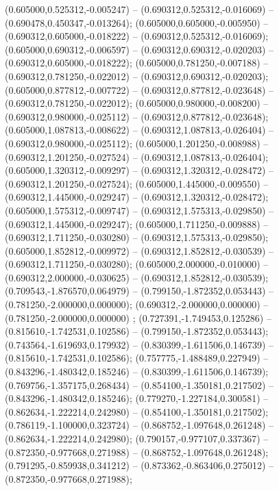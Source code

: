  (0.605000,0.525312,-0.005247) -- (0.690312,0.525312,-0.016069) -- (0.690478,0.450347,-0.013264);
 (0.605000,0.605000,-0.005950) -- (0.690312,0.605000,-0.018222) -- (0.690312,0.525312,-0.016069);
 (0.605000,0.690312,-0.006597) -- (0.690312,0.690312,-0.020203) -- (0.690312,0.605000,-0.018222);
 (0.605000,0.781250,-0.007188) -- (0.690312,0.781250,-0.022012) -- (0.690312,0.690312,-0.020203);
 (0.605000,0.877812,-0.007722) -- (0.690312,0.877812,-0.023648) -- (0.690312,0.781250,-0.022012);
 (0.605000,0.980000,-0.008200) -- (0.690312,0.980000,-0.025112) -- (0.690312,0.877812,-0.023648);
 (0.605000,1.087813,-0.008622) -- (0.690312,1.087813,-0.026404) -- (0.690312,0.980000,-0.025112);
 (0.605000,1.201250,-0.008988) -- (0.690312,1.201250,-0.027524) -- (0.690312,1.087813,-0.026404);
 (0.605000,1.320312,-0.009297) -- (0.690312,1.320312,-0.028472) -- (0.690312,1.201250,-0.027524);
 (0.605000,1.445000,-0.009550) -- (0.690312,1.445000,-0.029247) -- (0.690312,1.320312,-0.028472);
 (0.605000,1.575312,-0.009747) -- (0.690312,1.575313,-0.029850) -- (0.690312,1.445000,-0.029247);
 (0.605000,1.711250,-0.009888) -- (0.690312,1.711250,-0.030280) -- (0.690312,1.575313,-0.029850);
 (0.605000,1.852812,-0.009972) -- (0.690312,1.852812,-0.030539) -- (0.690312,1.711250,-0.030280);
 (0.605000,2.000000,-0.010000) -- (0.690312,2.000000,-0.030625) -- (0.690312,1.852812,-0.030539);
 (0.709543,-1.876570,0.064979) -- (0.799150,-1.872352,0.053443) -- (0.781250,-2.000000,0.000000);
 (0.690312,-2.000000,0.000000) -- (0.781250,-2.000000,0.000000) ;
 (0.727391,-1.749453,0.125286) -- (0.815610,-1.742531,0.102586) -- (0.799150,-1.872352,0.053443);
 (0.743564,-1.619693,0.179932) -- (0.830399,-1.611506,0.146739) -- (0.815610,-1.742531,0.102586);
 (0.757775,-1.488489,0.227949) -- (0.843296,-1.480342,0.185246) -- (0.830399,-1.611506,0.146739);
 (0.769756,-1.357175,0.268434) -- (0.854100,-1.350181,0.217502) -- (0.843296,-1.480342,0.185246);
 (0.779270,-1.227184,0.300581) -- (0.862634,-1.222214,0.242980) -- (0.854100,-1.350181,0.217502);
 (0.786119,-1.100000,0.323724) -- (0.868752,-1.097648,0.261248) -- (0.862634,-1.222214,0.242980);
 (0.790157,-0.977107,0.337367) -- (0.872350,-0.977668,0.271988) -- (0.868752,-1.097648,0.261248);
 (0.791295,-0.859938,0.341212) -- (0.873362,-0.863406,0.275012) -- (0.872350,-0.977668,0.271988);
